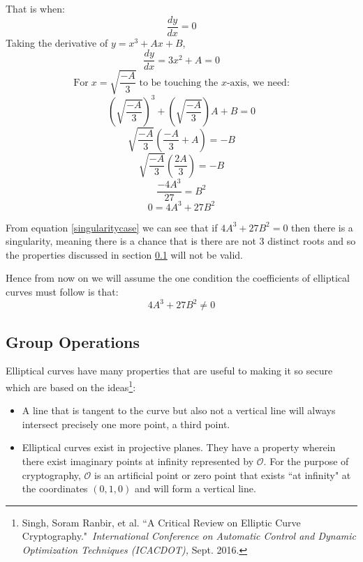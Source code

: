 \documentclass[a4paper,12pt]{article}
\theoremstyle{definition}
\begin{document}
That is when:
\begin{equation*}
	 \frac{dy}{dx} = 0
\end{equation*}
Taking the derivative of $y=x^3 + Ax +B$,
\begin{equation*}
	\frac{dy}{dx} = 3x^2 + A =0
\end{equation*}
\begin{equation*}
	\text{For} \; x= \sqrt{\frac{-A}{3}} \; \text{to be touching the $x$-axis, we need:}
\end{equation*}
\begin{equation*}
	\left(\sqrt{\frac{-A}{3}}\right)^3 +\left(\sqrt{\frac{-A}{3}}\right)A + B=0
\end{equation*}
\begin{equation*}
	\sqrt{\frac{-A}{3}}\left(\frac{-A}{3}+A\right)=-B
\end{equation*}
\begin{equation*}
		\sqrt{\frac{-A}{3}}\left(\frac{2A}{3}\right)=-B
\end{equation*}
\begin{equation*}
	\frac{-4A^3}{27}=B^2
\end{equation*}
\begin{equation} \label{singularitycase}
	0=4A^3+27B^2
\end{equation}

From equation \ref{singularitycase} we can see that if $4A^3+27B^2=0$ then there is a singularity, meaning there is a chance that is there are not 3 distinct roots and so the properties discussed in section \ref{properties} will not be valid.

Hence from now on we will assume the one condition the coefficients of elliptical curves must follow is that:
\begin{equation}
		 4A^3+27B^2 \neq 0
\end{equation}

\subsection{Group Operations} \label{properties}
Elliptical curves have many properties that are useful to making it so secure which are based on the ideas\footnote{Singh, Soram Ranbir, et al. ``A Critical Review on Elliptic Curve Cryptography." \textit{International Conference on Automatic Control and Dynamic Optimization Techniques (ICACDOT),} Sept. 2016.}:
\begin{itemize}
	\item A line that is tangent to the curve but also not a vertical line will always intersect precisely one more point, a third point.
	\item Elliptical curves exist in projective planes. They have a property wherein there exist imaginary points at infinity represented by $\mathcal{O}$. For the purpose of cryptography, $\mathcal{O}$ is an artificial point or zero point that exists ``at infinity" at the coordinates $(0,1,0)$ and will form a vertical line.
\end{itemize}
\end{document}
